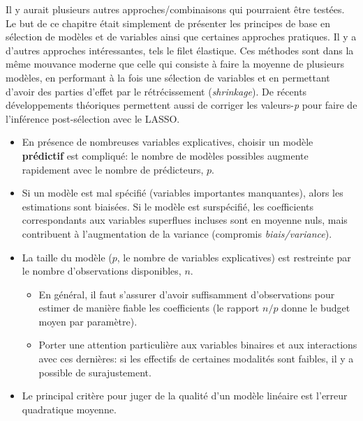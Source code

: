 \documentclass[
  11pt,
  letterpaper,
]{scrbook}
\providecommand{\tightlist}{%
  \setlength{\itemsep}{0pt}\setlength{\parskip}{0pt}}\usepackage{longtable,booktabs,array}
\theoremstyle{definition}
\theoremstyle{remark}
\begin{document}
Il y aurait plusieurs autres approches/combinaisons qui pourraient être
testées. Le but de ce chapitre était simplement de présenter les
principes de base en sélection de modèles et de variables ainsi que
certaines approches pratiques. Il y a d'autres approches intéressantes,
tels le filet élastique. Ces méthodes sont dans la même mouvance moderne
que celle qui consiste à faire la moyenne de plusieurs modèles, en
performant à la fois une sélection de variables et en permettant d'avoir
des parties d'effet par le rétrécissement (\emph{shrinkage}). De récents
développements théoriques permettent aussi de corriger les
valeurs-\emph{p} pour faire de l'inférence post-sélection avec le LASSO.

\begin{tcolorbox}[enhanced jigsaw, bottomtitle=1mm, bottomrule=.15mm, colbacktitle=quarto-callout-note-color!10!white, left=2mm, arc=.35mm, opacityback=0, colback=white, toprule=.15mm, coltitle=black, toptitle=1mm, colframe=quarto-callout-note-color-frame, titlerule=0mm, title=\textcolor{quarto-callout-note-color}{\faInfo}\hspace{0.5em}{En résumé}, opacitybacktitle=0.6, leftrule=.75mm, breakable, rightrule=.15mm]

\begin{itemize}
\tightlist
\item
  En présence de nombreuses variables explicatives, choisir un modèle
  \textbf{prédictif} est compliqué: le nombre de modèles possibles
  augmente rapidement avec le nombre de prédicteurs, \(p\).
\item
  Si un modèle est mal spécifié (variables importantes manquantes),
  alors les estimations sont biaisées. Si le modèle est surspécifié, les
  coefficients correspondants aux variables superflues incluses sont en
  moyenne nuls, mais contribuent à l'augmentation de la variance
  (compromis \emph{biais/variance}).
\item
  La taille du modèle (\(p\), le nombre de variables explicatives) est
  restreinte par le nombre d'observations disponibles, \(n\).

  \begin{itemize}
  \tightlist
  \item
    En général, il faut s'assurer d'avoir suffisamment d'observations
    pour estimer de manière fiable les coefficients (le rapport \(n/p\)
    donne le budget moyen par paramètre).
  \item
    Porter une attention particulière aux variables binaires et aux
    interactions avec ces dernières: si les effectifs de certaines
    modalités sont faibles, il y a possible de surajustement.
  \end{itemize}
\item
  Le principal critère pour juger de la qualité d'un modèle linéaire est
  l'erreur quadratique moyenne.


\end{itemize}
\end{tcolorbox}
\end{document}
